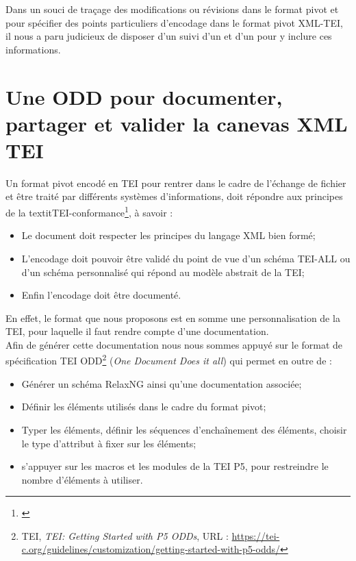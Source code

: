 Dans un souci de traçage des modifications ou révisions dans le format pivot et pour spécifier des points particuliers d'encodage dans le format pivot XML-TEI, il nous a paru judicieux de disposer d'un  suivi d'un 
 et d'un  pour y inclure ces informations.

\section{Une ODD pour documenter, partager et valider la canevas XML TEI}

Un format pivot encodé en TEI pour rentrer dans le cadre de l'échange de fichier et être traité par différents systèmes d'informations, doit répondre aux principes de la textit{TEI-conformance}\footnote{\cite{camps_structuration_2017}}, à savoir :
\begin{itemize}
    \item Le document doit respecter les principes du langage XML bien formé;
    \item L'encodage doit pouvoir être validé du point de vue d'un schéma TEI-ALL ou d'un schéma personnalisé qui répond au modèle abstrait de la TEI;
    \item Enfin l'encodage doit être documenté.
\end{itemize}

En effet, le format que nous proposons est en somme une personnalisation de la TEI, pour laquelle il faut rendre compte d'une documentation.\\

Afin de générer cette documentation nous nous sommes appuyé sur le format de spécification TEI ODD\footnote{TEI, \textit{TEI: Getting Started with P5 ODDs}, URL : \url{https://tei-c.org/guidelines/customization/getting-started-with-p5-odds/}} (\textit{One Document Does it all}) qui permet en outre de :
\begin{itemize}
    \item Générer un schéma RelaxNG ainsi qu'une documentation associée;
    \item Définir les éléments utilisés dans le cadre du format pivot;
    \item Typer les éléments, définir les séquences d'enchaînement des éléments, choisir le type d'attribut à fixer sur les éléments;
    \item s'appuyer sur les macros et les modules de la TEI P5, pour restreindre le nombre d'éléments à utiliser.
\end{itemize}

